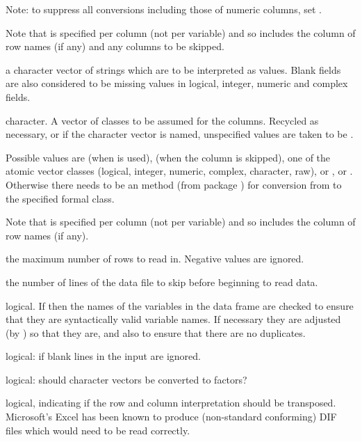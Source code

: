 \begin{Arguments}
\begin{ldescription}
Note: to suppress all conversions including those of numeric
columns, set .

Note that  is specified per column (not per
variable) and so includes the column of row names (if any) and any
columns to be skipped.


\item[\code{na.strings}] a character vector of strings which are to be
interpreted as  values.  Blank fields are also
considered to be missing values in logical, integer, numeric and
complex fields.

\item[\code{colClasses}] character.  A vector of classes to be assumed for
the columns.  Recycled as necessary, or if the character vector is
named, unspecified values are taken to be .

Possible values are  (when  is
used),  (when the column is skipped), one of the atomic
vector classes (logical, integer, numeric, complex, character, raw),
or ,  or .  Otherwise
there needs to be an  method (from package )
for conversion from  to the specified formal
class.

Note that  is specified per column (not per
variable) and so includes the column of row names (if any).


\item[\code{nrows}] the maximum number of rows to read in.  Negative values
are ignored.

\item[\code{skip}] the number of lines of the data file to skip before
beginning to read data.

\item[\code{check.names}] logical.  If  then the names of the
variables in the data frame are checked to ensure that they are
syntactically valid variable names.  If necessary they are adjusted
(by ) so that they are, and also to ensure
that there are no duplicates.

\item[\code{blank.lines.skip}] logical: if  blank lines in the
input are ignored.

\item[\code{stringsAsFactors}] logical: should character vectors be converted
to factors?

\item[\code{transpose}] logical, indicating if the row and column
interpretation should be transposed.  Microsoft's Excel has been
known to produce (non-standard conforming) DIF files which would
need  to be read correctly.
\end{ldescription}
\end{Arguments}
